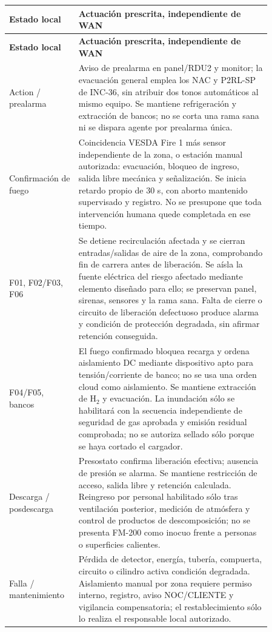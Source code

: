 \begin{longtable}{|p{0.20\linewidth}|p{0.66\linewidth}|}
\hline \textbf{Estado local} & \textbf{Actuación prescrita, independiente de WAN} \\\hline
\endfirsthead
\hline \textbf{Estado local} & \textbf{Actuación prescrita, independiente de WAN} \\\hline
\endhead
Action / prealarma & Aviso de prealarma en panel/RDU2 y monitor; la evacuación general emplea los NAC y P2RL-SP de INC-36, sin atribuir dos tonos automáticos al mismo equipo. Se mantiene refrigeración y extracción de bancos; no se corta una rama sana ni se dispara agente por prealarma única. \\\hline
Confirmación de fuego & Coincidencia VESDA Fire 1 más sensor independiente de la zona, o estación manual autorizada: evacuación, bloqueo de ingreso, salida libre mecánica y señalización. Se inicia retardo propio de 30 s, con aborto mantenido supervisado y registro. No se presupone que toda intervención humana quede completada en ese tiempo. \\\hline
F01, F02/F03, F06 & Se detiene recirculación afectada y se cierran entradas/salidas de aire de la zona, comprobando fin de carrera antes de liberación. Se aísla la fuente eléctrica del riesgo afectado mediante elemento diseñado para ello; se preservan panel, sirenas, sensores y la rama sana. Falta de cierre o circuito de liberación defectuoso produce alarma y condición de protección degradada, sin afirmar retención conseguida. \\\hline
F04/F05, bancos & El fuego confirmado bloquea recarga y ordena aislamiento DC mediante dispositivo apto para tensión/corriente de banco; no se usa una orden cloud como aislamiento. Se mantiene extracción de H$_2$ y evacuación. La inundación sólo se habilitará con la secuencia independiente de seguridad de gas aprobada y emisión residual comprobada; no se autoriza sellado sólo porque se haya cortado el cargador. \\\hline
Descarga / posdescarga & Presostato confirma liberación efectiva; ausencia de presión se alarma. Se mantiene restricción de acceso, salida libre y retención calculada. Reingreso por personal habilitado sólo tras ventilación posterior, medición de atmósfera y control de productos de descomposición; no se presenta FM-200 como inocuo frente a personas o superficies calientes. \\\hline
Falla / mantenimiento & Pérdida de detector, energía, tubería, compuerta, circuito o cilindro activa condición degradada. Aislamiento manual por zona requiere permiso interno, registro, aviso NOC/CLIENTE y vigilancia compensatoria; el restablecimiento sólo lo realiza el responsable local autorizado. \\\hline
\end{longtable}

